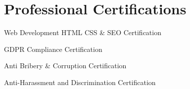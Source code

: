 \documentclass[a4paper, 11pt]{article}
\newcommand{\resumeSubHeadingListStart}{\begin{itemize}[leftmargin=0.1in, label={}]}
\newcommand{\resumeSubHeadingListEnd}{\end{itemize}\vspace{5pt}}
\begin{document}
\section{Professional Certifications}
    \resumeSubHeadingListStart
        \small{
            \item Web Development HTML CSS \& SEO Certification
            \item GDPR Compliance Certification
            \item Anti Bribery \& Corruption Certification
            \item Anti-Harassment and Discrimination Certification
        }
    \resumeSubHeadingListEnd
\end{document}
